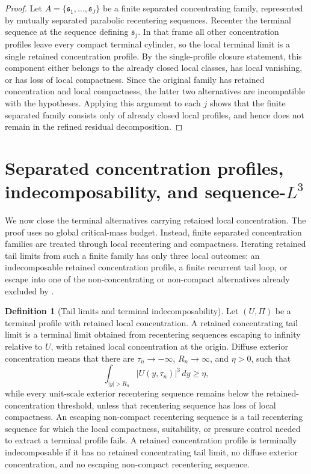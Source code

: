 \documentclass[11pt]{amsart}
\numberwithin{equation}{section}
\theoremstyle{plain}
\theoremstyle{definition}
\newtheorem{definition}[theorem]{Definition}
\theoremstyle{remark}
\begin{document}
\begin{proof}
Let \(A=\{\mathfrak s_1,\dots,\mathfrak s_J\}\) be a finite separated
concentrating
family, represented by mutually separated parabolic recentering sequences.
Recenter the terminal sequence at the sequence defining \(\mathfrak s_j\).
In that frame all other concentration profiles leave every compact terminal
cylinder, so the local terminal limit is a single retained concentration
profile.  By the single-profile closure statement, this component either belongs to
the already closed local classes, has local vanishing, or has loss of local
compactness.  Since the original family has retained concentration and local
compactness, the latter two alternatives are incompatible with the hypotheses.
Applying this argument to each \(j\) shows that the finite separated family
consists only of already closed local profiles, and hence does not remain in the
refined residual decomposition.
\end{proof}

\section{Separated concentration profiles, indecomposability, and sequence-\texorpdfstring{\(L^3\)}{L3}}
\label{sec:separated-profiles-atomic}

We now close the terminal alternatives carrying retained local concentration.
The proof uses no global critical-mass budget.  Instead, finite separated
concentration families are treated
through local recentering and compactness.  Iterating retained tail limits from
such a finite family has only
three local outcomes: an indecomposable retained concentration profile, a
finite recurrent tail loop, or escape into one of the non-concentrating or
non-compact alternatives already excluded by
.

\begin{definition}[Tail limits and terminal indecomposability]
\label{def:atomic-terminal-profile}
Let \((U,\Pi)\) be a terminal profile with retained local concentration.  A
retained concentrating tail limit is a terminal limit obtained from recentering
sequences escaping to infinity relative to \(U\), with retained local
concentration at the origin.  Diffuse exterior concentration means that there
are \(\tau_n\to-\infty\), \(R_n\to\infty\), and \(\eta>0\), such that
\[
   \int_{|y|>R_n}|U(y,\tau_n)|^3\,dy\ge\eta,
\]
while every unit-scale exterior recentering sequence remains below the
retained-concentration threshold, unless that recentering sequence has loss of
local compactness.  An escaping non-compact recentering sequence is a tail
recentering sequence for which the local compactness, suitability, or pressure
control needed to extract a terminal profile fails.  A retained concentration
profile is terminally indecomposable if it has no retained concentrating tail
limit, no diffuse exterior concentration, and no escaping non-compact
recentering sequence.
\end{definition}
\end{document}
